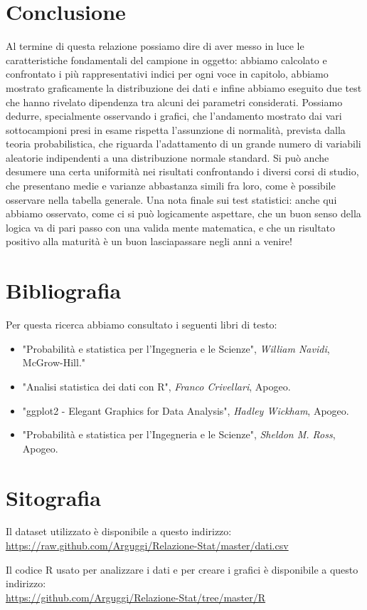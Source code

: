 \clearpage
\section{Conclusione}
Al termine di questa relazione possiamo dire di aver messo in luce le caratteristiche fondamentali del campione in oggetto: abbiamo calcolato e confrontato i più rappresentativi indici per ogni voce in capitolo, abbiamo mostrato graficamente la distribuzione dei dati e infine abbiamo eseguito due test che hanno rivelato dipendenza tra alcuni dei parametri considerati.
Possiamo dedurre, specialmente osservando i grafici, che l’andamento mostrato dai vari sottocampioni presi in esame rispetta l’assunzione di normalità, prevista dalla teoria probabilistica, che riguarda l’adattamento di un grande numero di variabili aleatorie indipendenti a una distribuzione normale standard.  
Si può anche desumere una certa uniformità nei risultati confrontando i diversi corsi di studio, che presentano medie e varianze abbastanza simili fra loro, come è possibile osservare nella tabella generale.
Una nota finale sui test statistici: anche qui abbiamo osservato, come ci si può logicamente aspettare, che un buon senso della logica va di pari passo con una valida mente matematica, e che un risultato positivo alla maturità è un buon lasciapassare negli anni a venire!
\clearpage

\section{Bibliografia}
Per questa ricerca abbiamo consultato i seguenti libri di testo:
\begin{itemize}
  \item "Probabilità e statistica per l’Ingegneria e le Scienze", \textit{William Navidi}, McGrow-Hill."
  \item "Analisi statistica dei dati con R", \textit{Franco Crivellari}, Apogeo.
  \item "ggplot2 - Elegant Graphics for Data Analysis", \textit{Hadley Wickham}, Apogeo.
  \item "Probabilità e statistica per l’Ingegneria e le Scienze", \textit{Sheldon M. Ross}, Apogeo.
\end{itemize}

\section{Sitografia}

Il dataset utilizzato è disponibile a questo indirizzo: \\
\url{https://raw.github.com/Arguggi/Relazione-Stat/master/dati.csv}

\noindent Il codice R usato per analizzare i dati e per creare i grafici è disponibile a questo indirizzo: \\
\url{https://github.com/Arguggi/Relazione-Stat/tree/master/R}
